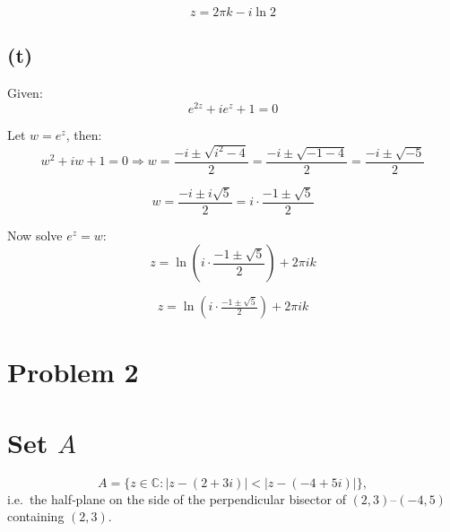 \documentclass{article}
\begin{document}
\[
\boxed{z = 2\pi k - i \ln 2}
\]
\subsection*{(t)}
Given:
\[
e^{2z} + i e^z + 1 = 0
\]

Let \(w = e^z\), then:
\[
w^2 + i w + 1 = 0
\Rightarrow w = \frac{-i \pm \sqrt{i^2 - 4}}{2} = \frac{-i \pm \sqrt{-1 - 4}}{2} = \frac{-i \pm \sqrt{-5}}{2}
\]

\[
w = \frac{-i \pm i\sqrt{5}}{2} = i \cdot \frac{-1 \pm \sqrt{5}}{2}
\]

Now solve \(e^z = w\):
\[
z = \ln\left(i \cdot \frac{-1 \pm \sqrt{5}}{2}\right) + 2\pi i k
\]

\[
\boxed{z = \ln\left(i \cdot \tfrac{-1 \pm \sqrt{5}}{2}\right) + 2\pi i k}
\]
\section*{Problem 2}
\section*{Set \(A\)}
\[
A = \{z\in\mathbb{C} : |z-(2+3i)| < |z-(-4+5i)|\},
\]
i.e.\ the half‐plane on the side of the perpendicular bisector of \((2,3)\)--\((-4,5)\)\,containing \((2,3)\).
\begin{center}
\end{center}

\end{document}
